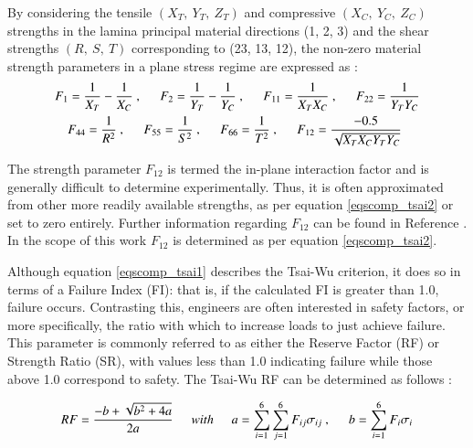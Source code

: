 By considering the tensile $(X_T,\ Y_T,\ Z_T)$ and compressive $(X_C,\ Y_C,\ Z_C)$ strengths in the lamina principal material directions (1, 2, 3) and the shear strengths $(R,\ S,\ T)$ corresponding to (23, 13, 12), the non-zero material strength parameters in a plane stress regime are expressed as \cite{reddy2004mechanics}:
\begin{gather} 
	\begin{aligned}
		&F_1 = \frac{1}{X_T} - \frac{1}{X_C}\ ,
		\hspace{5mm}
		F_2 = \frac{1}{Y_T} - \frac{1}{Y_C}\ ,
		\hspace{5mm}
		F_{11} = \frac{1}{X_TX_C}\ ,
		\hspace{5mm}
		F_{22} = \frac{1}{Y_TY_C}
		\\
		&\ \ \ \ 
		F_{44} = \frac{1}{R^2}\ ,
		\hspace{5mm}
		F_{55} = \frac{1}{S^2}\ ,
		\hspace{5mm}
		F_{66} = \frac{1}{T^2}\ ,
		\hspace{5mm}
		F_{12} = \frac{-0.5}{\sqrt{X_TX_CY_TY_C}}
		\label{eqscomp_tsai2}
	\end{aligned}
\end{gather}

The strength parameter $F_{12}$ is termed the in-plane interaction factor and is generally difficult to determine experimentally. Thus, it is often approximated from other more readily available strengths, as per equation \ref{eqscomp_tsai2} or set to zero entirely. Further information regarding $F_{12}$ can be found in Reference \cite{tsai12}. In the scope of this work $F_{12}$ is determined as per equation \ref{eqscomp_tsai2}.

Although equation \ref{eqscomp_tsai1} describes the Tsai-Wu criterion, it does so in terms of a Failure Index (FI): that is, if the calculated FI is greater than 1.0, failure occurs. Contrasting this, engineers are often interested in safety factors, or more specifically, the ratio with which to increase loads to just achieve failure. This parameter is commonly referred to as either the Reserve Factor (RF) or Strength Ratio (SR), with values less than 1.0 indicating failure while those above 1.0 correspond to safety. The Tsai-Wu RF can be determined as follows \cite{kolios2012evaluation}:

\begin{equation} 
RF = \frac{-b + \sqrt{b^2 + 4a}}{2a}
\hspace{5mm}with\hspace{5mm}
a = \sum_{i=1}^{6} \sum_{j=1}^{6} F_{ij} \sigma_{ij}\ ,
\hspace{5mm}
b = \sum_{i=1}^{6} F_i \sigma_i 
\label{eqscomp_stress_recovery3}
\end{equation}


